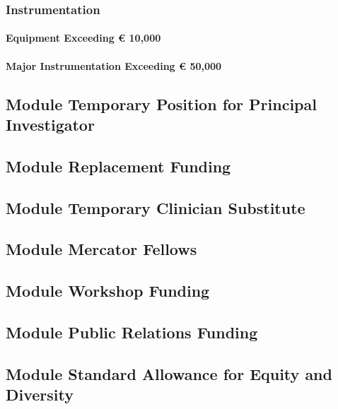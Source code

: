 \documentclass[de]{dfg-proposal}
\begin{document}
\subsubsection{Instrumentation}

\paragraph{Equipment Exceeding € 10,000}

\paragraph{Major Instrumentation Exceeding € 50,000}

\subsection{Module Temporary Position for Principal Investigator}

\subsection{Module Replacement Funding}

\subsection{Module Temporary Clinician Substitute}

\subsection{Module Mercator Fellows}

\subsection{Module Workshop Funding}

\subsection{Module Public Relations Funding}

\subsection{Module Standard Allowance for Equity and Diversity}
\end{document}

